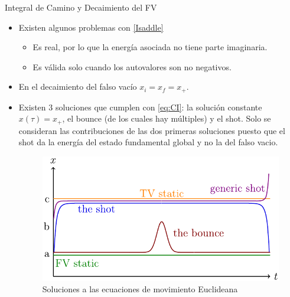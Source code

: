 \documentclass{beamer}
\theoremstyle{example}
\theoremstyle{example}
\begin{document}
\begin{frame}{Integral de Camino y Decaimiento del FV}
\begin{itemize}
    \item Existen algunos problemas con \eqref{Isaddle}
    \begin{itemize}
        \item Es real, por lo que la energía asociada no tiene parte imaginaria.
        
        \item Es válida solo cuando los autovalores son no negativos. 
    \end{itemize}
    
\item En el decaimiento del falso vacío $x_i = x_f = x_+$.

\item Existen 3 soluciones que cumplen con \eqref{eq:CI}: la solución constante $x(\tau) = x_+$, el bounce (de los cuales hay múltiples) y el shot. Solo se consideran las contribuciones de las dos primeras soluciones puesto que el shot da la energía del estado fundamental global y no la del falso vacio.
    
    \begin{figure}
        \centering
        \includegraphics[scale = 0.23]{soluciones.png}
        \caption{Soluciones a las ecuaciones de movimiento Euclideana}
        \label{fig:my_label}
    \end{figure}
\end{itemize}
\end{frame}
\end{document}
